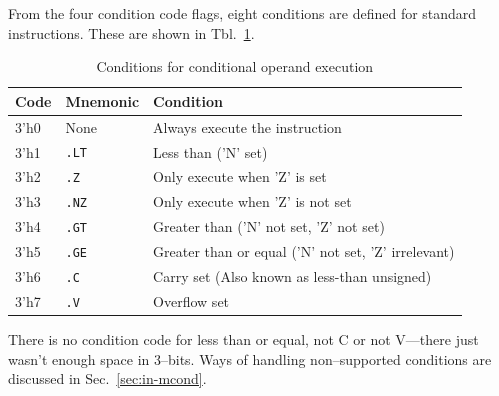 \documentclass{gqtekspec}
\begin{document}
From the four condition code flags, eight conditions are defined for standard
instructions.  These are shown in Tbl.~\ref{tbl:conditions}.
\begin{table}\begin{center}
\begin{tabular}{l|l|l}
Code & Mnemonic & Condition \\\hline
3'h0 & None & Always execute the instruction \\
3'h1 & {\tt .LT}& Less than ('N' set) \\
3'h2 & {\tt .Z} & Only execute when 'Z' is set \\
3'h3 & {\tt .NZ}& Only execute when 'Z' is not set \\
3'h4 & {\tt .GT}& Greater than ('N' not set, 'Z' not set) \\
3'h5 & {\tt .GE}& Greater than or equal ('N' not set, 'Z' irrelevant) \\
3'h6 & {\tt .C} & Carry set (Also known as less-than unsigned) \\
3'h7 & {\tt .V} & Overflow set\\
\end{tabular}
\caption{Conditions for conditional operand execution}\label{tbl:conditions}
\end{center}\end{table}
There is no condition code for less than or equal, not C or not V---there
just wasn't enough space in 3--bits.  Ways of handling non--supported 
conditions are discussed in Sec.~\ref{sec:in-mcond}.
\end{document}
